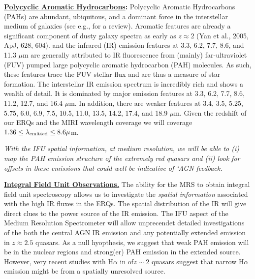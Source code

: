 \smallskip
\smallskip
\noindent
{\bf \underline{Polycyclic Aromatic Hydrocarbons}:}
Polycyclic Aromatic Hydrocarbons (PAHs) are abundant, ubiquitous, and
a dominant force in the interstellar medium of galaxies (see e.g., for
a review).  Aromatic features are already a significant component of
dusty galaxy spectra as early as $z\approx2$ (Yan et al., 2005, ApJ,
628, 604).  and the infrared (IR) emission features at 3.3, 6.2, 7.7,
8.6, and 11.3 $\mu$m are generally attributed to IR fluorescence from
(mainly) far-ultraviolet (FUV) pumped large polycyclic aromatic
hydrocarbon (PAH) molecules. As such, these features trace the FUV
stellar flux and are thus a measure of star formation.  The
interstellar IR emission spectrum is incredibly rich and shows a
wealth of detail.  It is dominated by major emission features at 3.3,
6.2, 7.7, 8.6, 11.2, 12.7, and 16.4 $\mu$m.  In addition, there are
weaker features at 3.4, 3.5, 5.25, 5.75, 6.0, 6.9, 7.5, 10.5, 11.0,
13.5, 14.2, 17.4, and 18.9 $\mu$m.  Given the redshift of our ERQs and
the MIRI wavelength coverage we will coverage $1.36 \leq \lambda_{\rm
emitted} \leq 8.6 \mu$m.


\smallskip
\smallskip
\noindent
{\it With the IFU spatial information, at medium resolution, we will be able to 
(i) map the PAH emission structure of the extremely red quasars and (ii) look 
for offsets in these emissions that could well be indicative of `AGN feedback.}

\smallskip
\smallskip
\noindent
{\bf \underline{Integral Field Unit Observations.}}
The ability for the MRS to obtain integral field unit spectroscopy
allows us to investigate the {\it spatial information} associated with
the high IR fluxes in the ERQs. The spatial distribution of the IR
will give direct clues to the power source of the IR emission.  The
IFU aspect of the Medium Resolution Spectrometer will allow
unprecendet detailed investigations of the both the central AGN IR
emission and any potentially extended emission in $z\approx2.5$
quasars.  As a null hyopthesis, we suggest that weak PAH emission will
be in the nuclear regions and strong(er) PAH emission in the extended
source. However, very recent studies with H$\alpha$ in of$z\sim2$
quasars suggest that narrow H$\alpha$ emission might be from a
spatially unresolved source.

